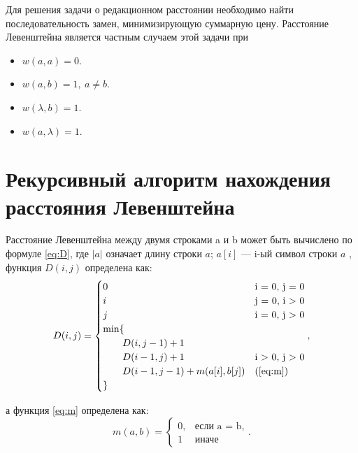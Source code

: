 \documentclass[12pt]{report}
\begin{document}
Для решения задачи о редакционном расстоянии необходимо найти последовательность замен, минимизирующую суммарную цену. Расстояние Левенштейна является частным случаем этой задачи при

\begin{itemize}

	\item $w(a,a)=0$.

	\item $w(a,b)=1, \medspace a \neq b$.

	\item $w(\lambda,b)=1$.

	\item $w(a,\lambda)=1$.

\end{itemize} 


\section{Рекурсивный алгоритм нахождения расстояния Левенштейна}

Расстояние Левенштейна между двумя строками a и b может быть вычислено по формуле \ref{eq:D}, где $|a|$ означает длину строки $a$; $a[i]$ — i-ый символ строки $a$ , функция $D(i, j)$ определена как:
\begin{equation}
\label{eq:D}
D(i, j) = \begin{cases}
0 &\text{i = 0, j = 0}\\
i &\text{j = 0, i > 0}\\
j &\text{i = 0, j > 0}\\
\min \lbrace \\
\qquad D(i, j-1) + 1\\
\qquad D(i-1, j) + 1 &\text{i > 0, j > 0}\\
\qquad D(i-1, j-1) + m(a[i], b[j]) &\text(\ref{eq:m})\\
\rbrace
\end{cases},
\end{equation}

а функция \ref{eq:m} определена как:
\begin{equation}
\label{eq:m}
m(a, b) = \begin{cases}
0, &\text{если a = b,}\\
1 &\text{иначе}
\end{cases}.
\end{equation}
\end{document}
